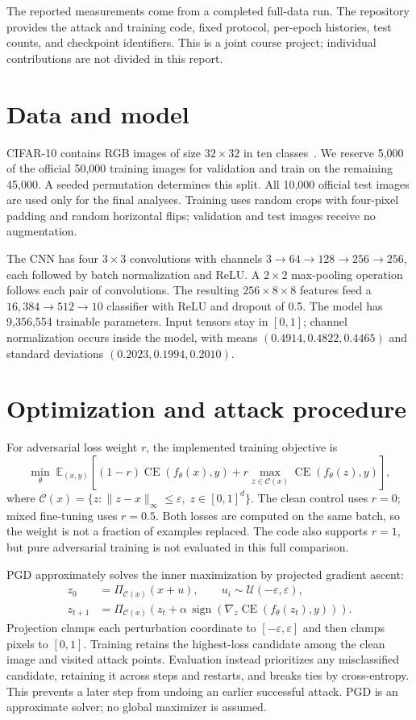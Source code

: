 \documentclass[10pt,a4paper]{article}
\newcommand{\eps}{\varepsilon}
\newcommand{\CE}{\operatorname{CE}}
\begin{document}
The reported measurements come from a completed full-data run. The repository
provides the attack and training code, fixed protocol, per-epoch histories,
test counts, and checkpoint identifiers. This is a joint course project;
individual contributions are not divided in this report.

\section{Data and model}
CIFAR-10 contains RGB images of size $32\times32$ in ten classes~\cite{cifar}.
We reserve 5,000 of the official 50,000 training images for validation and train
on the remaining 45,000. A seeded permutation determines this split. All 10,000
official test images are used only for the final analyses. Training uses random
crops with four-pixel padding and random horizontal flips; validation and test
images receive no augmentation.

The CNN has four $3\times3$ convolutions with channels
$3\rightarrow64\rightarrow128\rightarrow256\rightarrow256$, each followed by
batch normalization and ReLU. A $2\times2$ max-pooling operation follows each pair
of convolutions. The resulting $256\times8\times8$ features feed a
$16{,}384\rightarrow512\rightarrow10$ classifier with ReLU and dropout of 0.5.
The model has 9,356,554 trainable parameters. Input tensors stay in $[0,1]$;
channel normalization occurs inside the model, with means
$(0.4914,0.4822,0.4465)$ and standard deviations $(0.2023,0.1994,0.2010)$.

\newpage
\section{Optimization and attack procedure}
For adversarial loss weight $r$, the implemented training objective is
\begin{equation}
\min_\theta\;\mathbb{E}_{(x,y)}\!\left[
(1-r)\CE(f_\theta(x),y)
+r\max_{z\in\mathcal C(x)}\CE(f_\theta(z),y)\right],
\end{equation}
where $\mathcal C(x)=\{z:\|z-x\|_\infty\leq\eps,\;z\in[0,1]^d\}$.
The clean control uses $r=0$; mixed fine-tuning uses $r=0.5$. Both losses are
computed on the same batch, so the weight is not a fraction of examples replaced.
The code also supports $r=1$, but pure adversarial training is not evaluated in
this full comparison.

PGD approximately solves the inner maximization by projected gradient ascent:
\begin{align}
z_0 &= \Pi_{\mathcal C(x)}(x+u),\qquad u_i\sim\mathcal U(-\eps,\eps),\\
z_{t+1} &= \Pi_{\mathcal C(x)}\!\left(z_t+
\alpha\,\operatorname{sign}(\nabla_z\CE(f_\theta(z_t),y))\right).
\end{align}
Projection clamps each perturbation coordinate to $[-\eps,\eps]$ and then clamps
pixels to $[0,1]$. Training retains the highest-loss candidate among the clean
image and visited attack points. Evaluation instead prioritizes any
misclassified candidate, retaining it across steps and restarts, and breaks ties
by cross-entropy. This prevents a later step from undoing an earlier successful
attack. PGD is an approximate solver; no global maximizer is assumed.
\end{document}
